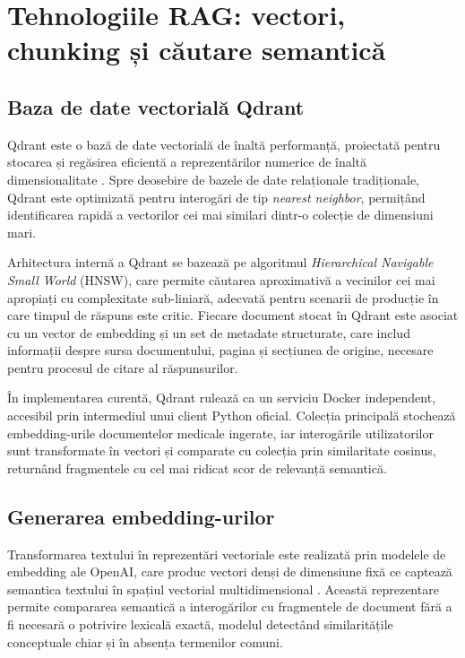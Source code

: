 \documentclass[12pt, a4paper, oneside, romanian]{teza-upb}
\begin{document}
\section{Tehnologiile RAG: vectori, chunking și căutare semantică}

\subsection{Baza de date vectorială Qdrant}

Qdrant este o bază de date vectorială de înaltă performanță, proiectată pentru stocarea și regăsirea eficientă a reprezentărilor numerice de înaltă dimensionalitate \cite{qdrant_doc}. Spre deosebire de bazele de date relaționale tradiționale, Qdrant este optimizată pentru interogări de tip \textit{nearest neighbor}, permițând identificarea rapidă a vectorilor cei mai similari dintr-o colecție de dimensiuni mari.

Arhitectura internă a Qdrant se bazează pe algoritmul \textit{Hierarchical Navigable Small World} (HNSW), care permite căutarea aproximativă a vecinilor cei mai apropiați cu complexitate sub-liniară, adecvată pentru scenarii de producție în care timpul de răspuns este critic. Fiecare document stocat în Qdrant este asociat cu un vector de embedding și un set de metadate structurate, care includ informații despre sursa documentului, pagina și secțiunea de origine, necesare pentru procesul de citare al răspunsurilor.

În implementarea curentă, Qdrant rulează ca un serviciu Docker independent, accesibil prin intermediul unui client Python oficial. Colecția principală stochează embedding-urile documentelor medicale ingerate, iar interogările utilizatorilor sunt transformate în vectori și comparate cu colecția prin similaritate cosinus, returnând fragmentele cu cel mai ridicat scor de relevanță semantică.

\subsection{Generarea embedding-urilor}

Transformarea textului în reprezentări vectoriale este realizată prin modelele de embedding ale OpenAI, care produc vectori denși de dimensiune fixă ce captează semantica textului în spațiul vectorial multidimensional \cite{mikolov2013word2vec}. Această reprezentare permite compararea semantică a interogărilor cu fragmentele de document fără a fi necesară o potrivire lexicală exactă, modelul detectând similaritățile conceptuale chiar și în absența termenilor comuni.
\end{document}
